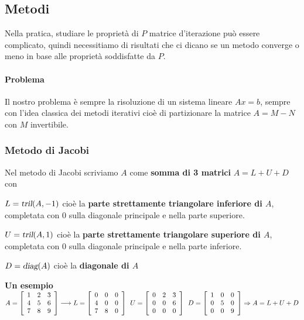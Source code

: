 \documentclass[10pt]{book}
\begin{document}
\subsection{Metodi} Nella pratica, studiare le proprietà di $P$ matrice d'iterazione può essere complicato, quindi necessitiamo di risultati che ci dicano se un metodo converge o meno in base alle proprietà soddisfatte da $P$.
\paragraph{Problema} Il nostro problema è sempre la risoluzione di un sistema lineare $Ax = b$, sempre con l'idea classica dei metodi iterativi cioè di partizionare la matrice $A = M-N$ con $M$ invertibile.
\subsubsection{Metodo di Jacobi}
Nel metodo di Jacobi scriviamo $A$ come \textbf{somma di 3 matrici} $A = L + U + D$ con \begin{list}{}{}
	\item $L = \textsl{tril}(A, -1)$ cioè la \textbf{parte strettamente triangolare inferiore di $A$}, completata con 0 sulla diagonale principale e nella parte superiore.
	\item $U = \textsl{tril}(A, 1)$ cioè la \textbf{parte strettamente triangolare superiore di $A$}, completata con 0 sulla diagonale principale e nella parte inferiore.
	\item $D = \textsl{diag}(A)$ cioè la \textbf{diagonale di $A$}
\end{list}
\textbf{Un esempio}\\
$A = \left[\begin{array}{c c c}
1&2&3\\4&5&6\\7&8&9
\end{array}\right] \longrightarrow L = \left[\begin{array}{c c c}
0&0&0\\4&0&0\\7&8&0
\end{array}\right] \:\: U = \left[\begin{array}{c c c}
0&2&3\\0&0&6\\0&0&0
\end{array}\right] \:\: D = \left[\begin{array}{c c c}
1&0&0\\0&5&0\\0&0&9
\end{array}\right] \Rightarrow A = L+U+D$
\end{document}
